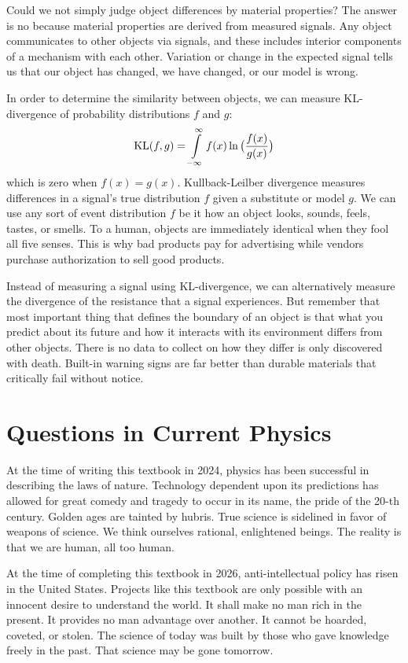 \documentclass[10pt, a5paper, twoside, openright]{memoir}
\begin{document}
Could we not simply judge object differences by material properties? The answer is no because material properties are derived from measured signals. Any object communicates to other objects via signals, and these includes interior components of a mechanism with each other. Variation or change in the expected signal tells us that our object has changed, we have changed, or our model is wrong.

In order to determine the similarity between objects, we can measure KL-divergence of probability distributions $f$ and $g$:
$$\textnormal{KL}(f, g) = \int\limits_{- \infty}^\infty f(x) \ln \big( \frac{f(x)}{g(x)} \big)$$
which is zero when $f(x) = g(x)$. Kullback-Leilber divergence measures differences in a signal's true distribution $f$ given a substitute or model $g$. We can use any sort of event distribution $f$ be it how an object looks, sounds, feels, tastes, or smells. To a human, objects are immediately identical when they fool all five senses. This is why bad products pay for advertising while vendors purchase authorization to sell good products.

Instead of measuring a signal using KL-divergence, we can alternatively measure the divergence of the resistance that a signal experiences. But remember that most important thing that defines the boundary of an object is that what you predict about its future and how it interacts with its environment differs from other objects. There is no data to collect on how they differ is only discovered with death. Built-in warning signs are far better than durable materials that critically fail without notice.

\chapter{Questions in Current Physics}
At the time of writing this textbook in 2024, physics has been successful in describing the laws of nature. Technology dependent upon its predictions has allowed for great comedy and tragedy to occur in its name, the pride of the 20-th century. Golden ages are tainted by hubris. True science is sidelined in favor of weapons of science. We think ourselves rational, enlightened beings. The reality is that we are human, all too human.

At the time of completing this textbook in 2026, anti-intellectual policy has risen in the United States. Projects like this textbook are only possible with an innocent desire to understand the world. It shall make no man rich in the present. It provides no man advantage over another. It cannot be hoarded, coveted, or stolen. The science of today was built by those who gave knowledge freely in the past. That science may be gone tomorrow.
\end{document}

